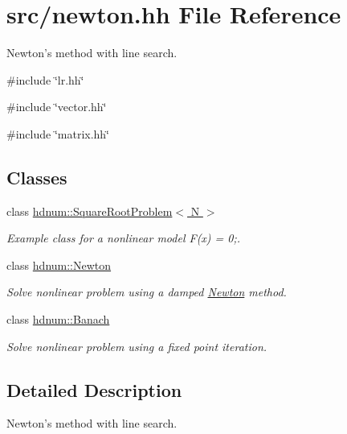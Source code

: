 \hypertarget{newton_8hh}{
\section{src/newton.hh File Reference}
\label{newton_8hh}
}


Newton's method with line search.  


{\ttfamily \#include \char`\"{}lr.hh\char`\"{}}\par
{\ttfamily \#include \char`\"{}vector.hh\char`\"{}}\par
{\ttfamily \#include \char`\"{}matrix.hh\char`\"{}}\par
\subsection*{Classes}
\begin{DoxyCompactItemize}
\item 
class \hyperlink{classhdnum_1_1SquareRootProblem}{hdnum::SquareRootProblem$<$ N $>$}
\begin{DoxyCompactList}\small\item\em Example class for a nonlinear model F(x) = 0;. \item\end{DoxyCompactList}\item 
class \hyperlink{classhdnum_1_1Newton}{hdnum::Newton}
\begin{DoxyCompactList}\small\item\em Solve nonlinear problem using a damped \hyperlink{classhdnum_1_1Newton}{Newton} method. \item\end{DoxyCompactList}\item 
class \hyperlink{classhdnum_1_1Banach}{hdnum::Banach}
\begin{DoxyCompactList}\small\item\em Solve nonlinear problem using a fixed point iteration. \item\end{DoxyCompactList}\end{DoxyCompactItemize}


\subsection{Detailed Description}
Newton's method with line search. 